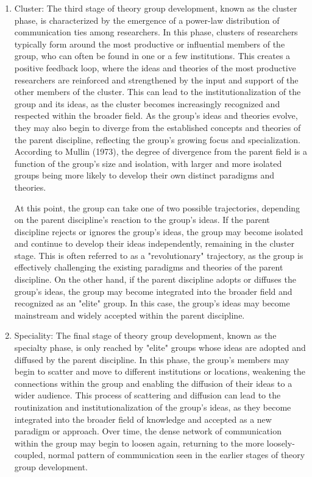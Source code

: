 \begin{enumerate}
\item Cluster: The third stage of theory group development, known as the cluster phase, is characterized by the emergence of a power-law distribution of communication ties among researchers. In this phase, clusters of researchers typically form around the most productive or influential members of the group, who can often be found in one or a few institutions. This creates a positive feedback loop, where the ideas and theories of the most productive researchers are reinforced and strengthened by the input and support of the other members of the cluster. This can lead to the institutionalization of the group and its ideas, as the cluster becomes increasingly recognized and respected within the broader field. As the group's ideas and theories evolve, they may also begin to diverge from the established concepts and theories of the parent discipline, reflecting the group's growing focus and specialization. According to Mullin (1973), the degree of divergence from the parent field is a function of the group's size and isolation, with larger and more isolated groups being more likely to develop their own distinct paradigms and theories. 

At this point, the group can take one of two possible trajectories, depending on the parent discipline's reaction to the group's ideas. If the parent discipline rejects or ignores the group's ideas, the group may become isolated and continue to develop their ideas independently, remaining in the cluster stage. This is often referred to as a "revolutionary" trajectory, as the group is effectively challenging the existing paradigms and theories of the parent discipline. On the other hand, if the parent discipline adopts or diffuses the group's ideas, the group may become integrated into the broader field and recognized as an "elite" group. In this case, the group's ideas may become mainstream and widely accepted within the parent discipline.

\item Speciality: The final stage of theory group development, known as the specialty phase, is only reached by "elite" groups whose ideas are adopted and diffused by the parent discipline. In this phase, the group's members may begin to scatter and move to different institutions or locations, weakening the connections within the group and enabling the diffusion of their ideas to a wider audience. This process of scattering and diffusion can lead to the routinization and institutionalization of the group's ideas, as they become integrated into the broader field of knowledge and accepted as a new paradigm or approach. Over time, the dense network of communication within the group may begin to loosen again, returning to the more loosely-coupled, normal pattern of communication seen in the earlier stages of theory group development.

\end{enumerate}

